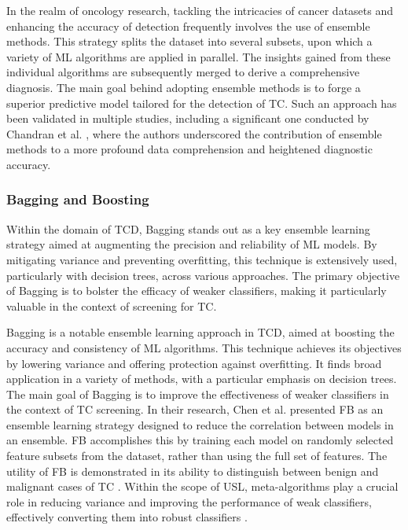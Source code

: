 \documentclass[a4paper,fleqn]{cas-sc}
\begin{document}
In the realm of oncology research, tackling the intricacies of cancer datasets and enhancing the accuracy of detection frequently involves the use of ensemble methods. This strategy splits the dataset into several subsets, upon which a variety of \ac{ML} algorithms are applied in parallel. The insights gained from these individual algorithms are subsequently merged to derive a comprehensive diagnosis. The main goal behind adopting ensemble methods is to forge a superior predictive model tailored for the detection of TC. Such an approach has been validated in multiple studies, including a significant one conducted by Chandran et al. \cite{chandran2021diagnosis}, where the authors underscored the contribution of ensemble methods to a more profound data comprehension and heightened diagnostic accuracy.

\subsubsection{Bagging and Boosting}
Within the domain of \ac{TCD}, Bagging stands out as a key ensemble learning strategy aimed at augmenting the precision and reliability of \ac{ML} models. By mitigating variance and preventing overfitting, this technique is extensively used, particularly with decision trees, across various approaches. The primary objective of Bagging is to bolster the efficacy of weaker classifiers, making it particularly valuable in the context of screening for TC.

\vskip2mm


Bagging is a notable ensemble learning approach in \ac{TCD}, aimed at boosting the accuracy and consistency of \ac{ML} algorithms. This technique achieves its objectives by lowering variance and offering protection against overfitting. It finds broad application in a variety of methods, with a particular emphasis on decision trees. The main goal of Bagging is to improve the effectiveness of weaker classifiers in the context of TC screening. In their research, Chen et al. \cite{chen2020diagnosis} presented \ac{FB} as an ensemble learning strategy designed to reduce the correlation between models in an ensemble. \ac{FB} accomplishes this by training each model on randomly selected feature subsets from the dataset, rather than using the full set of features. The utility of \ac{FB} is demonstrated in its ability to distinguish between benign and malignant cases of TC \cite{himeur2021artificial}. Within the scope of \ac{USL}, meta-algorithms play a crucial role in reducing variance and improving the performance of weak classifiers, effectively converting them into robust classifiers \cite{mehta2019high}.
\end{document}
